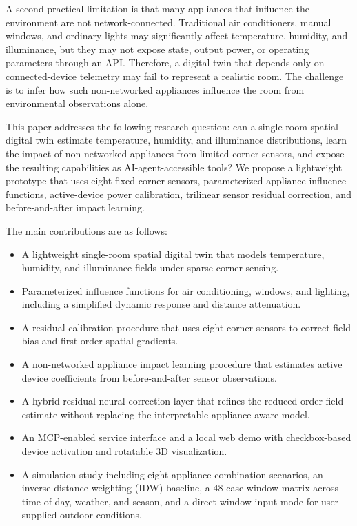 \documentclass[conference]{IEEEtran}
\begin{document}
A second practical limitation is that many appliances that influence the environment are not network-connected. Traditional air conditioners, manual windows, and ordinary lights may significantly affect temperature, humidity, and illuminance, but they may not expose state, output power, or operating parameters through an API. Therefore, a digital twin that depends only on connected-device telemetry may fail to represent a realistic room. The challenge is to infer how such non-networked appliances influence the room from environmental observations alone.

This paper addresses the following research question: can a single-room spatial digital twin estimate temperature, humidity, and illuminance distributions, learn the impact of non-networked appliances from limited corner sensors, and expose the resulting capabilities as AI-agent-accessible tools? We propose a lightweight prototype that uses eight fixed corner sensors, parameterized appliance influence functions, active-device power calibration, trilinear sensor residual correction, and before-and-after impact learning.

The main contributions are as follows:
\begin{itemize}
\item A lightweight single-room spatial digital twin that models temperature, humidity, and illuminance fields under sparse corner sensing.
\item Parameterized influence functions for air conditioning, windows, and lighting, including a simplified dynamic response and distance attenuation.
\item A residual calibration procedure that uses eight corner sensors to correct field bias and first-order spatial gradients.
\item A non-networked appliance impact learning procedure that estimates active device coefficients from before-and-after sensor observations.
\item A hybrid residual neural correction layer that refines the reduced-order field estimate without replacing the interpretable appliance-aware model.
\item An MCP-enabled service interface and a local web demo with checkbox-based device activation and rotatable 3D visualization.
\item A simulation study including eight appliance-combination scenarios, an inverse distance weighting (IDW) baseline, a 48-case window matrix across time of day, weather, and season, and a direct window-input mode for user-supplied outdoor conditions.
\end{itemize}
\end{document}
